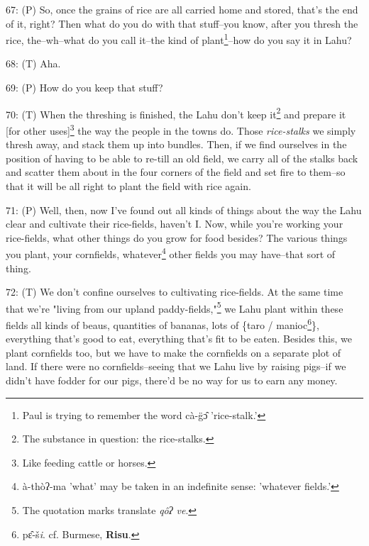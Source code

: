 67: (P) So, once the grains of rice are all carried home and stored, that's the
end of it, right? Then what do you do with that stuff--you know, after you thresh
the rice, the--wh--what do you call it--the kind of plant\footnote{Paul is trying to remember the word cà-g̈ɔ̂ 'rice-stalk.'}--how do you say it
in Lahu?

68: (T) Aha.

69: (P) How do you keep that stuff?

70: (T) When the threshing is finished, the Lahu don't keep it\footnote{The substance in question: the rice-stalks.} and prepare
it [for other uses]\footnote{Like feeding cattle or horses.} the way the people in the towns do. Those \textit{rice-stalks}
we simply thresh away, and stack them up into bundles. Then, if we find ourselves
in the position of having to be able to re-till an old field, we carry all of the
stalks back and scatter them about in the four corners of the field and set fire
to them--so that it will be all right to plant the field with rice again.

71: (P) Well, then, now I've found out all kinds of things about the way the Lahu
clear and cultivate their rice-fields, haven't I. Now, while you're working your
rice-fields, what other things do you grow for food besides? The various things
you plant, your cornfields, whatever\footnote{à-thòʔ-ma 'what' may be taken in an indefinite sense: 'whatever fields.'} other fields you may have--that sort of
thing.

72: (T) We don't confine ourselves to cultivating rice-fields. At the same time
that we're "living from our upland paddy-fields,"\footnote{The quotation marks translate\textit{ qôʔ ve}.} we Lahu
plant within these fields all kinds of beaus, quantities of bananas, lots of \{taro
/ manioc\footnote{pɛ̂-š\emph{i}. cf. Burmese, \textbf{Risu}.}\}, everything that's good to eat, everything that's fit to be eaten.
Besides this, we plant cornfields too, but we have to make the cornfields on a
separate plot of land. If there were no cornfields--seeing that we Lahu live by
raising pigs--if we didn't have fodder for our pigs, there'd be no way for us to
earn any money.


